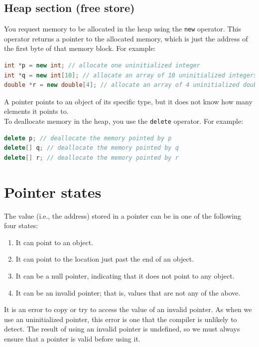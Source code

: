 \subsection{Heap section (free store)}

You request memory to be allocated in the heap using the \texttt{new} operator. This operator returns a pointer to the allocated memory,
which is just the address of the first byte of that memory block. For example:\\

\begin{lstlisting}[language=C++]
int *p = new int; // allocate one uninitialized integer
int *q = new int[10]; // allocate an array of 10 uninitialized integers
double *r = new double[4]; // allocate an array of 4 uninitialized doubles
\end{lstlisting}

A pointer points to an object of its specific type, but it does not know how many elements it points to.\\

To deallocate memory in the heap, you use the \texttt{delete} operator. For example:\\

\begin{lstlisting}[language=C++]
delete p; // deallocate the memory pointed by p
delete[] q; // deallocate the memory pointed by q
delete[] r; // deallocate the memory pointed by r
\end{lstlisting}

\section{Pointer states}

The value (i.e., the address) stored in a pointer can be in one of the following four states:

\begin{enumerate}
    \item It can point to an object.
    \item It can point to the location just past the end of an object.
    \item It can be a null pointer, indicating that it does not point to any object.
    \item It can be an invalid pointer; that is, values that are not any of the above.
\end{enumerate}

It is an error to copy or try to access the value of an invalid pointer. As when we use an uninitialized pointer,
this error is one that the compiler is unlikely to detect. The result of using an invalid pointer is undefined, so
we must always ensure that a pointer is valid before using it.\\

